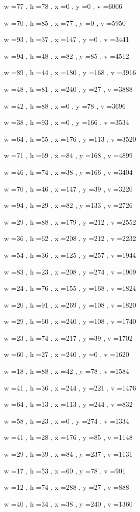 \documentclass[11pt]{article}
\begin{document}
w =77 , h =78 , x =0 , y =0 , v =6006
\par
w =70 , h =85 , x =77 , y =0 , v =5950
\par
w =93 , h =37 , x =147 , y =0 , v =3441
\par
w =94 , h =48 , x =82 , y =85 , v =4512
\par
w =89 , h =44 , x =180 , y =168 , v =3916
\par
w =48 , h =81 , x =240 , y =27 , v =3888
\par
w =42 , h =88 , x =0 , y =78 , v =3696
\par
w =38 , h =93 , x =0 , y =166 , v =3534
\par
w =64 , h =55 , x =176 , y =113 , v =3520
\par
w =71 , h =69 , x =84 , y =168 , v =4899
\par
w =46 , h =74 , x =38 , y =166 , v =3404
\par
w =70 , h =46 , x =147 , y =39 , v =3220
\par
w =94 , h =29 , x =82 , y =133 , v =2726
\par
w =29 , h =88 , x =179 , y =212 , v =2552
\par
w =36 , h =62 , x =208 , y =212 , v =2232
\par
w =54 , h =36 , x =125 , y =257 , v =1944
\par
w =83 , h =23 , x =208 , y =274 , v =1909
\par
w =24 , h =76 , x =155 , y =168 , v =1824
\par
w =20 , h =91 , x =269 , y =108 , v =1820
\par
w =29 , h =60 , x =240 , y =108 , v =1740
\par
w =23 , h =74 , x =217 , y =39 , v =1702
\par
w =60 , h =27 , x =240 , y =0 , v =1620
\par
w =18 , h =88 , x =42 , y =78 , v =1584
\par
w =41 , h =36 , x =244 , y =221 , v =1476
\par
w =64 , h =13 , x =113 , y =244 , v =832
\par
w =58 , h =23 , x =0 , y =274 , v =1334
\par
w =41 , h =28 , x =176 , y =85 , v =1148
\par
w =29 , h =39 , x =84 , y =237 , v =1131
\par
w =17 , h =53 , x =60 , y =78 , v =901
\par
w =12 , h =74 , x =288 , y =27 , v =888
\par
w =40 , h =34 , x =38 , y =240 , v =1360
\end{document}
